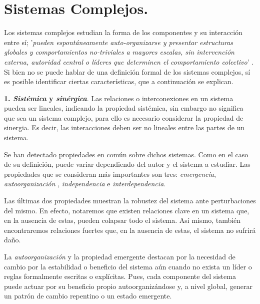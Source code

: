 \documentclass[../main.tex]{subfiles}
\begin{document}
\section{Sistemas Complejos.}

Los sistemas complejos estudian la forma de los componentes y su interacción entre sí; '\textit{pueden espontáneamente auto-organizarse y presentar
estructuras globales y comportamientos no-triviales a mayores
escalas, sin intervención externa, autoridad central o líderes que
determinen el comportamiento colectivo}' \cite{complejidad_explicada}. Si bien no se puede hablar de una definición formal de los sistemas complejos, sí es posible identificar ciertas características, que a continuación se explican.

\textbf{1. \textit{Sistémica} y \textit{sinérgica}}. Las relaciones o interconexiones en un sistema pueden ser lineales, indicando la propiedad sistémica, sin embargo no significa que sea un sistema complejo, para ello es necesario considerar la propiedad de sinergia. Es decir, las interacciones deben ser no lineales entre las partes de un sistema.








Se han detectado propiedades en común sobre dichos sistemas. Como en el caso de su definición, puede variar dependiendo del autor y el sistema a estudiar. Las propiedades que se consideran más importantes son tres: \textit{emergencia}, \textit{autoorganización} , \textit{independencia} e \textit{interdependencia}.

Las últimas dos propiedades muestran la robustez del sistema ante perturbaciones del mismo. En efecto, notaremos que existen relaciones clave en un sistema que, en la ausencia de estas, pueden colapsar todo el sistema. Así mismo, también encontraremos relaciones fuertes que, en la ausencia de estas, el sistema no sufrirá daño.

La \textit{autoorganización} y la propiedad emergente destacan por la necesidad de cambio por la estabilidad o beneficio del sistema aún cuando no exista un líder o reglas formalmente escritas o explícitas. Pues, cada componente del sistema puede actuar por su beneficio propio autoorganizándose y, a nivel global, generar un patrón de cambio repentino o un estado emergente.
\end{document}
